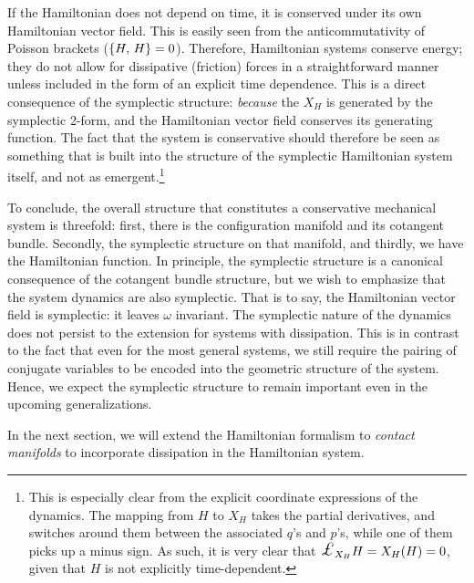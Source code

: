 If the Hamiltonian does not depend on time, it is conserved under its own Hamiltonian vector field. This is easily seen from the anticommutativity of Poisson brackets (\(\qty{H,\,H} = 0\)). Therefore, Hamiltonian systems conserve energy; they do not allow for dissipative (friction) forces in a straightforward manner unless included in the form of an explicit time dependence. This is a direct consequence of the symplectic structure: \emph{because} the \(X_H\) is generated by the symplectic 2-form, and the Hamiltonian vector field conserves its generating function. The fact that the system is conservative should therefore be seen as something that is built into the structure of the symplectic Hamiltonian system itself, and not as emergent.\footnote{This is especially clear from the explicit coordinate expressions of the dynamics. The mapping from \(H\) to \(X_H\) takes the partial derivatives, and switches around them between the associated \(q\)'s and \(p\)'s, while one of them picks up a minus sign. As such, it is very clear that \(\lied{X_H}{H} = X_H(H) = 0\), given that \(H\) is not explicitly time-dependent.}

To conclude, the overall structure that constitutes a conservative mechanical system is threefold: first, there is the configuration manifold and its cotangent bundle. Secondly, the symplectic structure on that manifold, and thirdly, we have the Hamiltonian function. In principle, the symplectic structure is a canonical consequence of the cotangent bundle structure, but we wish to emphasize that the system dynamics are also symplectic. That is to say, the Hamiltonian vector field is symplectic: it leaves \(\omega\) invariant. The symplectic nature of the dynamics does not persist to the extension for systems with dissipation. This is in contrast to the fact that even for the most general systems, we still require the pairing of conjugate variables to be encoded into the geometric structure of the system. Hence, we expect the symplectic structure to remain important even in the upcoming generalizations.

In the next section, we will extend the Hamiltonian formalism to \emph{contact manifolds} to incorporate dissipation in the Hamiltonian system.
